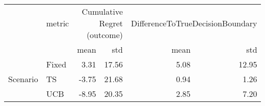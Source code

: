 \begin{tabular}{llrrrr}
 & metric & \multicolumn{2}{r}{Cumulative Regret (outcome)} & \multicolumn{2}{r}{DifferenceToTrueDecisionBoundary} \\
 &  & mean & std & mean & std \\
\multirow[c]{3}{*}{Scenario} & Fixed & 3.31 & 17.56 & 5.08 & 12.95 \\
 & TS & -3.75 & 21.68 & 0.94 & 1.26 \\
 & UCB & -8.95 & 20.35 & 2.85 & 7.20 \\
\end{tabular}
